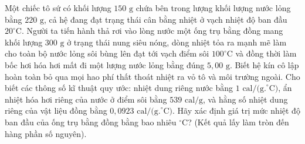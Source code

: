 \begin{ex}	Một chiếc tô sứ có khối lượng $150\text{ g}$ chứa bên trong lượng khối lượng nước lỏng bằng $220\text{ g}$, cả hệ đang đạt trạng thái cân bằng nhiệt ở vạch nhiệt độ ban đầu $20^\circ\text{C}$. Người ta tiến hành thả rơi vào lòng nước một ống trụ bằng đồng mang khối lượng $300\text{ g}$ ở trạng thái nung siêu nóng, dòng nhiệt tỏa ra mạnh mẽ làm cho toàn bộ nước lỏng sôi bùng lên đạt tới vạch điểm sôi $100^\circ\text{C}$ và đồng thời làm bốc hơi hóa hơi mất đi một lượng nước lỏng bằng đúng $5,00\text{ g}$. Biết hệ kín cô lập hoàn toàn bỏ qua mọi hao phí thất thoát nhiệt ra vỏ tô và môi trường ngoài. Cho biết các thông số kĩ thuật quy ước: nhiệt dung riêng nước bằng $1\text{ cal/(g.}^\circ\text{C)}$, ẩn nhiệt hóa hơi riêng của nước ở điểm sôi bằng $539\text{ cal/g}$, và hằng số nhiệt dung riêng của vật liệu đồng bằng $0,0923\text{ cal/(g.}^\circ\text{C)}$. Hãy xác định giá trị mức nhiệt độ ban đầu của ống trụ bằng đồng bằng bao nhiêu $^\circ\text{C}$? (Kết quả lấy làm tròn đến hàng phần số nguyên).

	\par{}
\end{ex}

